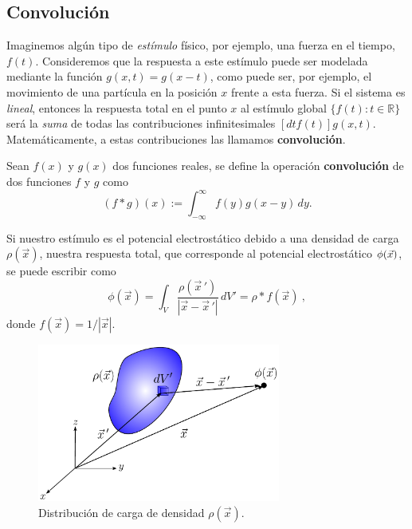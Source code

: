 \subsection{Convolución}

Imaginemos algún tipo de \emph{estímulo} físico, por ejemplo, una fuerza en el tiempo, $f(t)$. Consideremos que la respuesta a este estímulo puede ser modelada mediante la función $g(x,t) = g(x-t)$, como puede ser, por ejemplo, el movimiento de una partícula en la posición $x$ frente a esta fuerza. Si el sistema es \emph{lineal}, entonces la respuesta total en el punto $x$ al estímulo global $\{f(t) : t \in \mathbb{R} \}$ será la \emph{suma} de todas las contribuciones infinitesimales $[dt f(t)] g(x,t)$. Matemáticamente, a estas contribuciones las llamamos \textbf{convolución}.

\begin{defi}
Sean $f(x)$ y $g(x)$ dos funciones reales, se define la operación \textbf{convolución} de dos funciones $f$ y $g$ como 
\begin{equation}
 (f*g)(x) := \int_{-\infty}^{\infty} f(y) g(x-y) \,dy.   \label{Convolucion}
\end{equation}

\end{defi}


Si nuestro estímulo es el potencial electrostático debido a una densidad de carga $\rho(\Vec{x})$, nuestra respuesta total, que corresponde al potencial electrostático $\phi(\vec{x})$, se puede escribir como
\begin{equation}
    \phi(\Vec{x}) = \int_{V} \frac{\rho(\Vec{x}\,')}{|\Vec{x} - \Vec{x}\,'|} \, dV' = \rho * f(\Vec{x}) \ ,
\end{equation}
donde  $f(\Vec{x}) = 1/|\Vec{x}|$.
\begin{figure}[htbp]
    \centering
    \includegraphics[width = 8cm]{Figuras/Distribucion-Cargas.pdf}
    \caption{Distribución de carga de densidad $\rho(\Vec{x})$.}
    \label{fig:PotencialDistribucion}
\end{figure}

